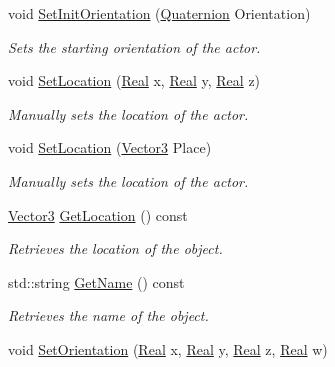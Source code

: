 \begin{DoxyCompactItemize}
void \hyperlink{classphys_1_1ActorBase_a681186465db767954ca3f9530a1d7c36}{SetInitOrientation} (\hyperlink{classphys_1_1Quaternion}{Quaternion} Orientation)
\begin{DoxyCompactList}\small\item\em Sets the starting orientation of the actor. \item\end{DoxyCompactList}\item 
void \hyperlink{classphys_1_1ActorBase_a0b0db2ec0f4926326635b86f1ead2276}{SetLocation} (\hyperlink{namespacephys_af7eb897198d265b8e868f45240230d5f}{Real} x, \hyperlink{namespacephys_af7eb897198d265b8e868f45240230d5f}{Real} y, \hyperlink{namespacephys_af7eb897198d265b8e868f45240230d5f}{Real} z)
\begin{DoxyCompactList}\small\item\em Manually sets the location of the actor. \item\end{DoxyCompactList}\item 
void \hyperlink{classphys_1_1ActorBase_a3212be459859a67bf7ae64919d58d5a5}{SetLocation} (\hyperlink{classphys_1_1Vector3}{Vector3} Place)
\begin{DoxyCompactList}\small\item\em Manually sets the location of the actor. \item\end{DoxyCompactList}\item 
\hyperlink{classphys_1_1Vector3}{Vector3} \hyperlink{classphys_1_1ActorBase_a777b4ea4d6881af76c646b1ba9324d96}{GetLocation} () const 
\begin{DoxyCompactList}\small\item\em Retrieves the location of the object. \item\end{DoxyCompactList}\item 
std::string \hyperlink{classphys_1_1ActorBase_afc1851d7445c98a9389b3902a214a5e1}{GetName} () const 
\begin{DoxyCompactList}\small\item\em Retrieves the name of the object. \item\end{DoxyCompactList}\item 
void \hyperlink{classphys_1_1ActorBase_adbf0cc77031f22597a799fd0f7f8216d}{SetOrientation} (\hyperlink{namespacephys_af7eb897198d265b8e868f45240230d5f}{Real} x, \hyperlink{namespacephys_af7eb897198d265b8e868f45240230d5f}{Real} y, \hyperlink{namespacephys_af7eb897198d265b8e868f45240230d5f}{Real} z, \hyperlink{namespacephys_af7eb897198d265b8e868f45240230d5f}{Real} w)

\end{DoxyCompactItemize}

